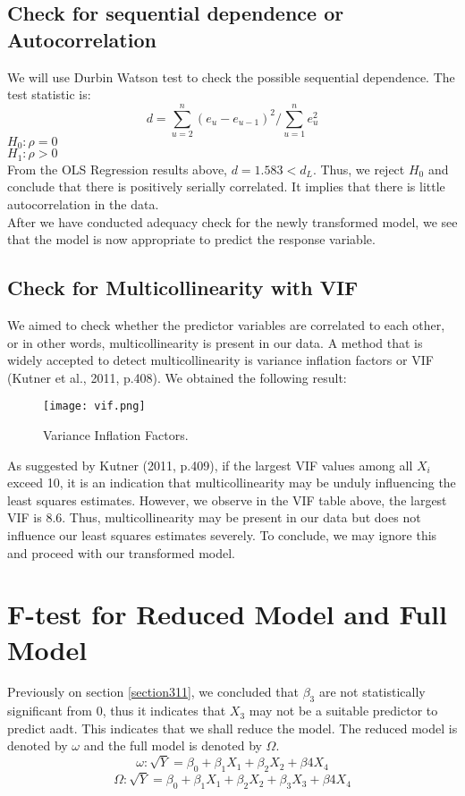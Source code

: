 \documentclass[english]{article}
\begin{document}
\subsection{Check for sequential dependence or Autocorrelation}
We will use Durbin Watson test to check the possible sequential dependence. The test statistic is: 
$$d = \sum_{u=2}^{n} (e_u-e_{u-1})^2 / \sum_{u=1}^{n} e_u^2$$
$H_0 : \rho = 0$ \\
$H_1 : \rho > 0$ \\
From the OLS Regression results above, $d = 1.583 < d_L$. Thus, we reject $H_0$ and conclude that there is positively serially correlated. It implies that there is little autocorrelation in the data. \\
After we have conducted adequacy check for the newly transformed model, we see that the model is now appropriate to predict the response variable. 

\subsection{Check for Multicollinearity with VIF}
We aimed to check whether the predictor variables are correlated to each other, or in other words, multicollinearity is present in our data. A method that is widely accepted to detect multicollinearity is variance inflation factors or VIF (Kutner et al., 2011, p.408). We obtained the following result: 

\begin{figure}[H]
	\begin{centering}
  		\texttt{[image: vif.png]}
  		\caption{Variance Inflation Factors.\label{vif}
}
	\end{centering}
\end{figure}

As suggested by Kutner (2011, p.409), if the largest VIF values among all $X_i$ exceed 10, it is an indication that multicollinearity may be unduly influencing the least squares estimates. However, we observe in the VIF table above, the largest VIF is 8.6. Thus, multicollinearity may be present in our data but does not influence our least squares estimates severely. To conclude, we may ignore this and proceed with our transformed model. 


\section{F-test for Reduced Model and Full Model}
Previously on section \ref{section311}, we concluded that $\beta_3$ are not statistically significant from 0, thus it indicates that $X_3$ may not be a suitable predictor to predict aadt. This indicates that we shall reduce the model. The reduced model is denoted by $\omega$ and the full model is denoted by $\Omega$. 
$$\omega: \sqrt{Y} =  \beta_0+\beta_1 X_1+\beta_2 X_2+ \beta4 X_4$$
$$\Omega: \sqrt{Y} =  \beta_0+\beta_1 X_1+\beta_2 X_2+ \beta_3 X_3+\beta4 X_4$$
\end{document}
